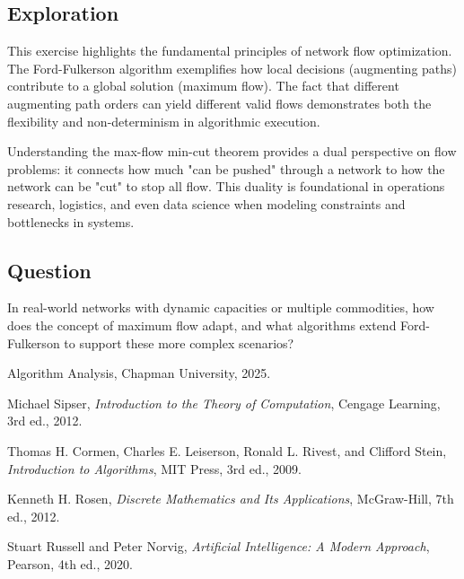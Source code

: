 \documentclass[11pt]{article}
\begin{document}
\subsection{Exploration}

This exercise highlights the fundamental principles of network flow optimization. The Ford-Fulkerson algorithm exemplifies how local decisions (augmenting paths) contribute to a global solution (maximum flow). The fact that different augmenting path orders can yield different valid flows demonstrates both the flexibility and non-determinism in algorithmic execution. 

Understanding the max-flow min-cut theorem provides a dual perspective on flow problems: it connects how much "can be pushed" through a network to how the network can be "cut" to stop all flow. This duality is foundational in operations research, logistics, and even data science when modeling constraints and bottlenecks in systems.

\subsection{Question}

In real-world networks with dynamic capacities or multiple commodities, how does the concept of maximum flow adapt, and what algorithms extend Ford-Fulkerson to support these more complex scenarios?

\newpage
\begin{thebibliography}{9}

Algorithm Analysis, Chapman University, 2025.

Michael Sipser, \textit{Introduction to the Theory of Computation}, Cengage Learning, 3rd ed., 2012.

Thomas H. Cormen, Charles E. Leiserson, Ronald L. Rivest, and Clifford Stein, \textit{Introduction to Algorithms}, MIT Press, 3rd ed., 2009.

Kenneth H. Rosen, \textit{Discrete Mathematics and Its Applications}, McGraw-Hill, 7th ed., 2012.

Stuart Russell and Peter Norvig, \textit{Artificial Intelligence: A Modern Approach}, Pearson, 4th ed., 2020.

\end{thebibliography}
\end{document}
